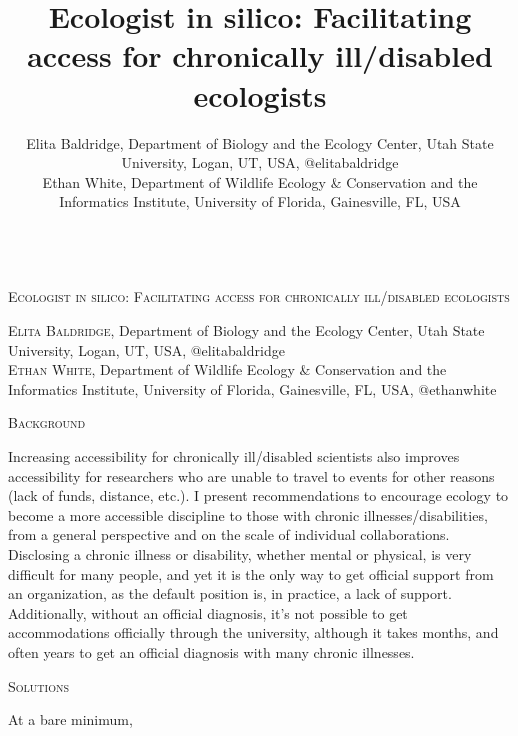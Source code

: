 \documentclass{beamer}
\author{Elita Baldridge, Department of Biology and the Ecology Center, Utah State University, Logan, UT, USA, @elitabaldridge  \\Ethan White, Department of Wildlife Ecology \& Conservation and the Informatics Institute, University of Florida, Gainesville, FL, USA}
\title[17pt]{Ecologist in silico: Facilitating access for chronically ill/disabled ecologists}
\date{}
\begin{document}
\begin{center} 
\begin{huge}
\textsc{%
\\Ecologist in silico: Facilitating access for chronically ill/disabled ecologists\\
 }
\end{huge}  
\begin{large}
\textsc{Elita Baldridge}, Department of Biology and the Ecology Center, Utah State University, Logan, UT, USA, @elitabaldridge\\  
\textsc{Ethan White}, Department of Wildlife Ecology \& Conservation and the Informatics Institute, University of Florida, Gainesville, FL, USA, @ethanwhite\\
\end{large}
\end{center}

\begin{minipage}{0.45\linewidth}
\begin{Large}
\begin{center}
\textsc{Background}
\end{center}
\end{Large}
Increasing accessibility for chronically ill/disabled scientists also improves accessibility for researchers who are unable to travel to events for other reasons (lack of funds, distance, etc.). I present recommendations to encourage ecology to become a more accessible discipline to those with chronic illnesses/disabilities, from a general perspective and on the scale of individual collaborations.\\ 

Disclosing a chronic illness or disability, whether mental or physical, is very difficult for many people, and yet it is the only way to get official support from an organization, as the default position is, in practice, a lack of support.  Additionally, without an official diagnosis, it's not possible to get accommodations officially through the university, although it takes months, and often years to get an official diagnosis with many chronic illnesses.  
\end{minipage}
\begin{minipage}{0.45\linewidth}
\begin{Large}
\begin{center}
\textsc{Solutions}
\end{center}
\end{Large}
At a bare minimum, 
\end{minipage}
\end{document}
